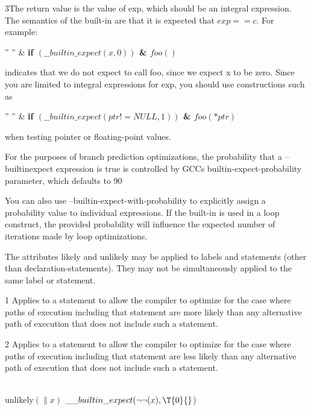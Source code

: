 \vskip 2pt\noindent
3The return value is the value of exp, which should be an integral expression.
The semantics of the built-in are that it is expected that $exp == c$. For
example:

\vskip 4pt\indent
\vbox{ \settabs\+ ''        '' & \cr %
\+ \bf if $(\_\_builtin\_expect(x, 0))$ \cr
\+ & $foo()$ \cr }

\vskip 2pt\noindent
indicates that we do not expect to call foo, since we expect x to be zero.
Since you are limited to integral expressions for exp, you should use
constructions such as

\vskip 4pt\indent
\vbox{ \settabs\+ ''        '' & \cr %
\+ \bf if $(\_\_builtin\_expect(ptr != NULL, 1))$ \cr
\+ & $foo(*ptr)$ \cr }

\vskip 2pt\noindent
when testing pointer or floating-point values.

\vskip 2pt\noindent
For the purposes of branch prediction optimizations, the probability that a
--builtinexpect expression is true is controlled by GCCs
builtin-expect-probability parameter, which defaults to 90%

\vskip 2pt\noindent
You can also use --builtin-expect-with-probability to explicitly assign a
probability value to individual expressions. If the built-in is used in a
loop construct, the provided probability will influence the expected number
of iterations made by loop optimizations.

\fi

The attributes likely and unlikely may be applied to labels and
statements
(other than declaration-statements). They may not be simultaneously applied
to the same label or statement.

\vskip 2pt\noindent
\item{1} Applies to a statement to allow the compiler to optimize for the case
where paths of execution including that statement are more likely than any
alternative path of execution that does not include such a statement.

\item{2} Applies to a statement to allow the compiler to optimize for the case
where paths of execution including that statement are less likely than any
alternative path of execution that does not include such a statement.

\Y\B\4\D\\{unlikely}$(\|x)$\5
$\\{\_\_builtin\_expect}(\R\R(\|x),\39\T{0}{}$)\par
\fi

